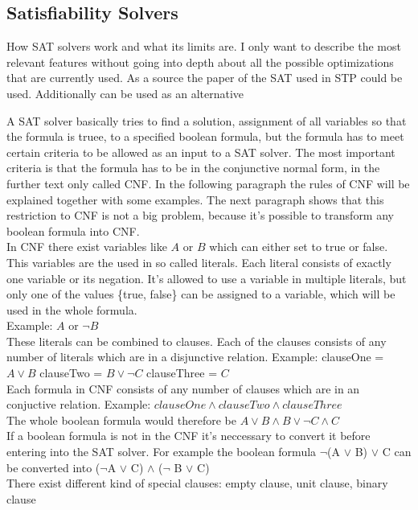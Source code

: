 \subsection{Satisfiability Solvers}
How SAT solvers work and what its limits are.
I only want to describe the most relevant features without going into depth about all the possible optimizations that are currently used.
As a source the paper of the SAT used in STP \cite{10.1007/978-3-540-24605-3_37} could be used. Additionally \cite{Gomes2008SatisfiabilityS} can be used as an alternative

A SAT solver basically tries to find a solution, assignment of all variables so that the formula is truee, to a specified boolean formula, but the formula has to meet certain criteria to be allowed as an input to a SAT solver. The most important criteria is that the formula has to be in the conjunctive normal form, in the further text only called CNF. In the following paragraph the rules of CNF will be explained together with some examples. The next paragraph shows that this restriction to CNF is not a big problem, because it's possible to transform any boolean formula into CNF.\\
In CNF there exist variables like $A$ or $B$ which can either set to true or false.
This variables are the used in so called literals. Each literal consists of exactly one variable or its negation. It's allowed to use a variable in multiple literals, but only one of the values \{true, false\} can be assigned to a variable, which will be used in the whole formula.\\
Example: $A$ or $\lnot B$\\
These literals can be combined to clauses. Each of the clauses consists of any number of literals which are in a disjunctive relation. 
Example: clauseOne = $A \lor B$ clauseTwo = $B \lor \lnot C$ clauseThree = $C$\\
Each formula in CNF consists of any number of clauses which are in an conjuctive relation. Example: $clauseOne \land clauseTwo \land clauseThree$\\
The whole boolean formula would therefore be $A \lor B \land B \lor \lnot C \land C$\\
If a boolean formula is not in the CNF it's neccessary to convert it before entering into the SAT solver. For example the boolean formula $\lnot$(A $\lor$ B) $\lor$ C can be converted into ($\lnot$A $\lor$ C) $\land$ ($\lnot$ B $\lor$ C)\\
There exist different kind of special clauses: empty clause, unit clause, binary clause
